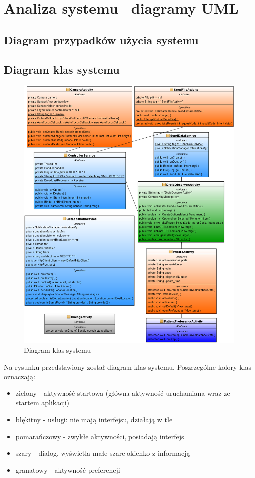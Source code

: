 \documentclass[11pt,a4paper]{article}
\begin{document}
\section {Analiza systemu– diagramy UML}
\subsection {Diagram przypadków użycia systemu}
\newpage
\subsection {Diagram klas systemu}
  \begin{figure}[h]
    \includegraphics[scale=0.4]{class_diagram.png}
    \caption{Diagram klas systemu}
  \end{figure}
Na rysunku przedstawiony został diagram klas systemu. Poszczególne kolory klas oznaczają:
\begin{itemize}
\item zielony - aktywność startowa (główna aktywność uruchamiana wraz ze startem aplikacji)
\item błękitny - usługi: nie mają interfejsu, działają w tle
\item pomarańczowy - zwykłe aktywności, posiadają interfejs
\item szary - dialog, wyświetla małe szare okienko z informacją
\item granatowy - aktywność preferencji
\end{itemize}
\end{document}
